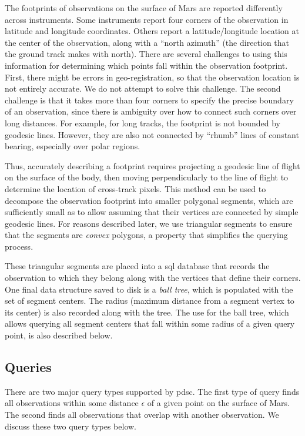 \documentclass[twocolumn]{extarticle}
\begin{document}
The footprints of observations on the surface of Mars are reported differently
across instruments. Some instruments report four corners of the observation in
latitude and longitude coordinates. Others report a latitude/longitude
location at the center of the observation, along with a ``north azimuth'' (the
direction that the ground track makes with north). There are several challenges
to using this information for determining which points fall within the
observation footprint. First, there might be errors in geo-registration, so that
the observation location is not entirely accurate. We do not attempt to solve
this challenge. The second challenge is that it takes more than four corners to
specify the precise boundary of an observation, since there is ambiguity over
how to connect such corners over long distances. For example, for long tracks,
the footprint is not bounded by geodesic lines. However, they are also not
connected by ``rhumb'' lines of constant bearing, especially over polar regions.

Thus, accurately describing a footprint requires projecting a geodesic line of
flight on the surface of the body, then moving perpendicularly to the line of
flight to determine the location of cross-track pixels. This method can be used
to decompose the observation footprint into smaller polygonal segments, which
are sufficiently small as to allow assuming that their vertices are connected by
simple geodesic lines. For reasons described later, we use triangular segments
to ensure that the segments are \emph{convex} polygons, a property that
simplifies the querying process.

These triangular segments are placed into a \ac{sql} database that records the
observation to which they belong along with the vertices that define their
corners. One final data structure saved to disk is a \emph{ball tree}, which is
populated with the set of segment centers. The radius (maximum distance from a
segment vertex to its center) is also recorded along with the tree. The use for
the ball tree, which allows querying all segment centers that fall within some
radius of a given query point, is also described below.

\subsection*{Queries}

There are two major query types supported by \ac{pdsc}. The first type of query
finds all observations within some distance $\epsilon$ of a given point on the
surface of Mars. The second finds all observations that overlap with another
observation. We discuss these two query types below.
\end{document}
